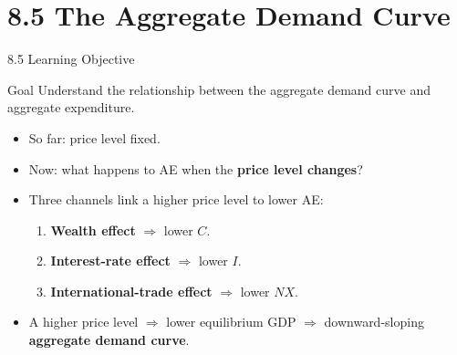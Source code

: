 \documentclass[aspectratio=169]{beamer}
\begin{document}
\section{8.5 The Aggregate Demand Curve}

\begin{frame}{8.5 Learning Objective}
\transfade
\begin{block}{Goal}
Understand the relationship between the aggregate demand curve and aggregate expenditure.
\end{block}
\begin{itemize}
  \item So far: price level fixed.
  \item Now: what happens to AE when the \textbf{price level changes}?
  \item Three channels link a higher price level to lower AE:
  \begin{enumerate}
    \item \textbf{Wealth effect} $\Rightarrow$ lower $C$.
    \item \textbf{Interest-rate effect} $\Rightarrow$ lower $I$.
    \item \textbf{International-trade effect} $\Rightarrow$ lower $NX$.
  \end{enumerate}
  \item A higher price level $\Rightarrow$ lower equilibrium GDP $\Rightarrow$ downward-sloping \textbf{aggregate demand curve}.
\end{itemize}
\end{frame}
\end{document}
